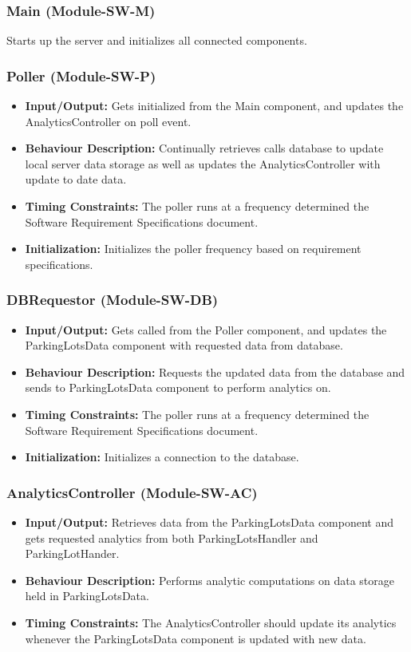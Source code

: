 \documentclass[]{article}
\begin{document}
	
	\subsubsection{Main (Module-SW-M)}
	Starts up the server and initializes all connected components.
	
	\subsubsection{Poller (Module-SW-P)}
	\begin{itemize}
		\item \textbf{Input/Output:} Gets initialized from the Main component, and updates the AnalyticsController on poll event.
		\item \textbf{Behaviour Description:} Continually retrieves calls database to update local server data storage as well as updates the AnalyticsController with update to date data.
		\item \textbf{Timing Constraints:} The poller runs at a frequency determined the Software Requirement Specifications document.
		\item \textbf{Initialization:} Initializes the poller frequency based on requirement specifications.
	\end{itemize}
	
	\subsubsection{DBRequestor (Module-SW-DB)}
	\begin{itemize}
		\item \textbf{Input/Output:} Gets called from the Poller component, and updates the ParkingLotsData component with requested data from database.
		\item \textbf{Behaviour Description:} Requests the updated data from the database and sends to ParkingLotsData component to perform analytics on.
		\item \textbf{Timing Constraints:} The poller runs at a frequency determined the Software Requirement Specifications document.
		\item \textbf{Initialization:} Initializes a connection to the database.
	\end{itemize}
	
	\subsubsection{AnalyticsController (Module-SW-AC)}
	\begin{itemize}
		\item \textbf{Input/Output:} Retrieves data from the ParkingLotsData component and gets requested analytics from both ParkingLotsHandler and ParkingLotHander.
		\item \textbf{Behaviour Description:} Performs analytic computations on data storage held in ParkingLotsData.
		\item \textbf{Timing Constraints:} The AnalyticsController should update its analytics whenever the ParkingLotsData component is updated with new data.
	\end{itemize}
	
\end{document}

